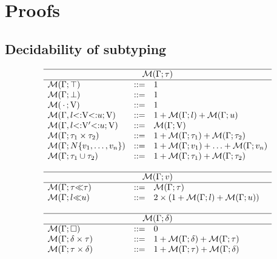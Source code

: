 \section{Proofs}

\subsection{Decidability of subtyping}\label{subsec:dec-proof}

\begin{figure}
\footnotesize
\[
\begin{array}{lcl}
    \hline
    \multicolumn{3}{c}{\tymsrdflt{\ty}} \\ 
    \hline 
    \tymsrdflt{\tyany} &::=& 1\\
    \tymsrdflt{\tybot} &::=& 1\\
    \tymsr{\,\EmptyEnv\,}{\vany} &::=& 1\\
    \tymsr{\AEnv, \varbound{\vany}{\tylb}{\tyub}}{\vany} &::=& 
        1 + \tymsrdflt{\tylb} + \tymsrdflt{\tyub}\\
    \tymsr{\AEnv, \varbound{\vany'}{\tylb}{\tyub}}{\vany} &::=& 
        \tymsrdflt{\vany} \\
    \tymsrdflt{\typair{\ty_1}{\ty_2}} &::=& 
        1 + \tymsrdflt{\ty_1} + \tymsrdflt{\ty_2}\\
    \tymsrdflt{\tyinv\iname{\rexvar_1,\ldots,\rexvar_n}} &::=&
        1 + \tymsrdflt{\rexvar_1} + \ldots + \tymsrdflt{\rexvar_n}\\
    \tymsrdflt{\tyunion{\ty_1}{\ty_2}} &::=& 
        1 + \tymsrdflt{\ty_1} + \tymsrdflt{\ty_2}\\
    \\
    \hline
    \multicolumn{3}{c}{\tymsrdflt{\rexvar}} \\ 
    \hline 
    \tymsrdflt{\rexvarbound{\ty}{\ty}} &::=& \tymsrdflt{\ty}\\
    \tymsrdflt{\rexvarbound{\tylb}{\tyub}} &::=& 
        2\times(1 + \tymsrdflt{\tylb} + \tymsrdflt{\tyub})\\
    \\
    \hline
    \multicolumn{3}{c}{\tymsrdflt{\dctx}} \\ 
    \hline 
    \tymsrdflt{\square} &::=& 0\\
    \tymsrdflt{\typair{\dctx}{\ty}} &::=& 
        1 + \tymsrdflt{\dctx} + \tymsrdflt{\ty}\\
    \tymsrdflt{\typair{\ty}{\dctx}} &::=& 
        1 + \tymsrdflt{\ty} + \tymsrdflt{\dctx}\\

\end{array}\]
\end{figure}
